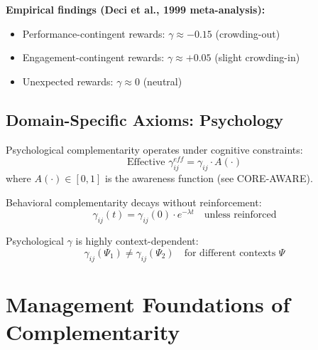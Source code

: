 \textbf{Empirical findings (Deci et al., 1999 meta-analysis):}
\begin{itemize}[noitemsep]
    \item Performance-contingent rewards: $\gamma \approx -0.15$ (crowding-out)
    \item Engagement-contingent rewards: $\gamma \approx +0.05$ (slight crowding-in)
    \item Unexpected rewards: $\gamma \approx 0$ (neutral)
\end{itemize}

\subsection{Domain-Specific Axioms: Psychology}

\begin{axiom}
Psychological complementarity operates under cognitive constraints:
\begin{equation}
\text{Effective } \gamma^{eff}_{ij} = \gamma_{ij} \cdot A(\cdot)
\end{equation}
where $A(\cdot) \in [0,1]$ is the awareness function (see CORE-AWARE).
\end{axiom}

\begin{axiom}
Behavioral complementarity decays without reinforcement:
\begin{equation}
\gamma_{ij}(t) = \gamma_{ij}(0) \cdot e^{-\lambda t} \quad \text{unless reinforced}
\end{equation}
\end{axiom}

\begin{axiom}
Psychological $\gamma$ is highly context-dependent:
\begin{equation}
\gamma_{ij}(\Psi_1) \neq \gamma_{ij}(\Psi_2) \quad \text{for different contexts } \Psi
\end{equation}
\end{axiom}

\section{Management Foundations of Complementarity}
\label{sec:management}

